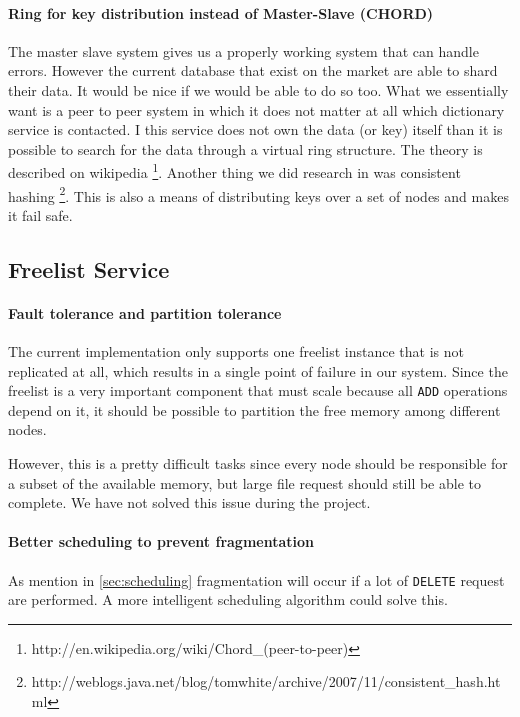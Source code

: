\documentclass[12pt,a4paper]{scrartcl}
\begin{document}
\paragraph{Ring for key distribution instead of Master-Slave (CHORD)}
The master slave system gives us a properly working system that can handle errors. However the current database that exist on the market are able to shard their data. It would be nice if we would be able to do so too. What we essentially want is a peer to peer system in which it does not matter at all which dictionary service is contacted. I this service does not own the data (or key) itself than it is possible to search for the data through a virtual ring structure. The theory is described on wikipedia \footnote{http://en.wikipedia.org/wiki/Chord\_(peer-to-peer)}. Another thing we did research in was consistent hashing \footnote{http://weblogs.java.net/blog/tomwhite/archive/2007/11/consistent\_hash.html}. This is also a means of distributing keys over a set of nodes and makes it fail safe.

\subsection{Freelist Service}
\paragraph{Fault tolerance and partition tolerance}
The current implementation only supports one freelist instance that is not replicated at all, which results in a single point of failure in our system. Since the freelist is a very important component that must scale because all \verb|ADD| operations depend on it, it should be possible to partition the free memory among different nodes.

However, this is a pretty difficult tasks since every node should be responsible for a subset of the available memory, but large file request should still be able to complete. We have not solved this issue during the project.

\paragraph{Better scheduling to prevent fragmentation}
As mention in \autoref{sec:scheduling} fragmentation will occur if a lot of \verb|DELETE| request are performed. A more intelligent scheduling algorithm could solve this.





\nocite{*}
\end{document}

